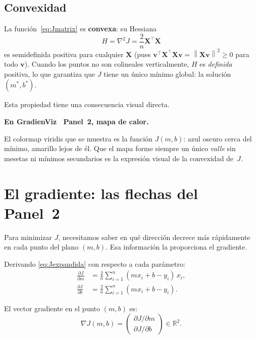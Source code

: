 \documentclass[12pt, a4paper]{article}
\newenvironment{viznota}[1]{%
  \begin{mdframed}[style=vizverde]
  \textbf{\color{bordeteo}En GradienViz \textemdash\ #1.}\quad
}{%
  \end{mdframed}
}
\newcommand{\R}{\mathbb{R}}
\newcommand{\norm}[1]{\left\lVert #1 \right\rVert}
\newcommand{\grad}{\nabla}
\newcommand{\mstar}{m^{*}}
\newcommand{\bstar}{b^{*}}
\newcommand{\Jfun}{J(m,b)}
\newcommand{\XtX}{\mathbf{X}^{\top}\mathbf{X}}
\newcommand{\T}{{\top}}
\begin{document}
\subsection{Convexidad}

La función~\eqref{eq:Jmatrix} es \textbf{convexa}: su Hessiana
\begin{equation}\label{eq:hessiana}
  H = \nabla^2 J = \frac{2}{n}\XtX
\end{equation}
es semidefinida positiva para cualquier $\mathbf{X}$ (pues $\mathbf{v}^\T \XtX \mathbf{v}
= \norm{\mathbf{X}\mathbf{v}}^2 \geq 0$ para todo $\mathbf{v}$).
Cuando los puntos no son colineales verticalmente, $H$ es \emph{definida} positiva,
lo que garantiza que $J$ tiene un único mínimo global: la solución
$(\mstar, \bstar)$.

Esta propiedad tiene una consecuencia visual directa.

\begin{viznota}{Panel~2, mapa de calor}
El colormap viridis que se muestra es la función $\Jfun$: azul oscuro cerca
del mínimo, amarillo lejos de él. Que el mapa forme siempre un único
\emph{valle} sin mesetas ni mínimos secundarios es la expresión visual
de la convexidad de~$J$.
\end{viznota}

\section{El gradiente: las flechas del Panel~2}

Para minimizar $J$, necesitamos saber en qué dirección decrece más rápidamente
en cada punto del plano $(m, b)$. Esa información la proporciona el gradiente.

Derivando \eqref{eq:Jexpandida} con respecto a cada parámetro:
\begin{align}
  \frac{\partial J}{\partial m} &=
    \frac{2}{n}\sum_{i=1}^{n}(m x_i + b - y_i)\,x_i,
  \label{eq:gm}\\[4pt]
  \frac{\partial J}{\partial b} &=
    \frac{2}{n}\sum_{i=1}^{n}(m x_i + b - y_i).
  \label{eq:gb}
\end{align}

El vector gradiente en el punto $(m, b)$ es:
\[
  \grad J(m, b) =
  \begin{pmatrix} \partial J/\partial m \\ \partial J/\partial b \end{pmatrix} \in \R^2.
\]
\end{document}
